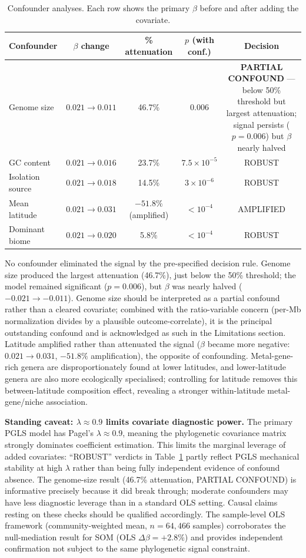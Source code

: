 \documentclass[times]{zHenriquesLab-StyleBioRxiv}
\begin{document}
\begin{table}[htbp]
\caption{Confounder analyses. Each row shows the primary $\beta$ before and
after adding the covariate.}
\label{tab:7}
\centering
\small
\begin{tabular}{lcccc}
\toprule
Confounder & $\beta$ change & \% attenuation & $p$ (with conf.) & Decision \\
\midrule
Genome size & $0.021 \to 0.011$ & 46.7\% & 0.006
  & \textbf{PARTIAL CONFOUND} --- below 50\% threshold but largest attenuation; signal persists ($p = 0.006$) but $\beta$ nearly halved \\
GC content & $0.021 \to 0.016$ & 23.7\% & $7.5 \times 10^{-5}$
  & ROBUST \\
Isolation source & $0.021 \to 0.018$ & 14.5\% & $3 \times 10^{-6}$
  & ROBUST \\
Mean latitude & $0.021 \to 0.031$ & $-51.8\%$ (amplified) & $<10^{-4}$
  & AMPLIFIED \\
Dominant biome & $0.021 \to 0.020$ & 5.8\% & $<10^{-4}$
  & ROBUST \\
\bottomrule
\end{tabular}
\end{table}

No confounder eliminated the signal by the pre-specified decision rule. Genome size produced the
largest attenuation (46.7\%), just below the 50\% threshold; the model
remained significant ($p = 0.006$), but $\beta$ was nearly halved ($-0.021 \to -0.011$).
Genome size should be interpreted as a partial confound rather than a cleared covariate;
combined with the ratio-variable concern (per-Mb normalization divides by a plausible
outcome-correlate), it is the principal outstanding confound and is acknowledged as such in
the Limitations section.
Latitude amplified rather than attenuated the signal ($\beta$ became more
negative: $0.021 \to 0.031$, $-51.8\%$ amplification), the opposite of
confounding. Metal-gene-rich genera are disproportionately found at lower
latitudes, and lower-latitude genera are also more ecologically specialised;
controlling for latitude removes this between-latitude composition effect,
revealing a stronger within-latitude metal-gene/niche association.

\textbf{Standing caveat: $\lambda \approx 0.9$ limits covariate diagnostic power.}
The primary PGLS model has Pagel's $\lambda \approx 0.9$, meaning the phylogenetic
covariance matrix strongly dominates coefficient estimation. This limits the
marginal leverage of added covariates: ``ROBUST'' verdicts in Table~\ref{tab:7}
partly reflect PGLS mechanical stability at high $\lambda$ rather than being
fully independent evidence of confound absence. The genome-size result (46.7\%
attenuation, PARTIAL CONFOUND) is informative precisely because it did break
through; moderate confounders may have less diagnostic leverage than in a
standard OLS setting. Causal claims resting on these checks should be qualified
accordingly. The sample-level OLS framework (community-weighted mean, $n = 64{,}466$
samples) corroborates the null-mediation result for SOM (OLS $\Delta\beta = +2.8\%$)
and provides independent confirmation not subject to the same phylogenetic signal
constraint.
\end{document}

